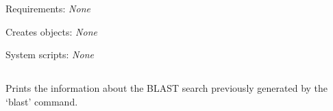 \begin{description}
\begin{enumerate}
\end{enumerate}


\item{Requirements:} {\em None}


\item{Creates objects:} {\em None}


\item{System scripts:} {\em None}

\end{description}



\subsection[blast\_info]{  }



Prints the information about the BLAST search previously
generated by the `blast' command.


